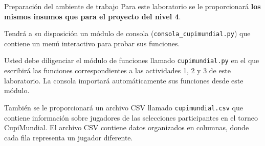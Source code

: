 \documentclass{ip-lab}
\begin{document}
\maketitle


\begin{sectionbox}{Preparación del ambiente de trabajo}
  Para este laboratorio se le proporcionará \textbf{los mismos insumos que para el proyecto del nivel 4}.
  
  Tendrá a su disposición un módulo de consola (\texttt{consola\_cupimundial.py}) que contiene un menú interactivo para probar sus funciones.

  Usted debe diligenciar el módulo de funciones llamado \texttt{cupimundial.py} en el que escribirá las funciones correspondientes a las actividades 1, 2 y 3 de este laboratorio. La consola importará automáticamente sus funciones desde este módulo.

  También se le proporcionará un archivo CSV llamado \texttt{cupimundial.csv} que contiene información sobre jugadores de las selecciones participantes en el torneo CupiMundial. El archivo CSV contiene datos organizados en columnas, donde cada fila representa un jugador diferente.
\end{sectionbox}

\pagebreak
\end{document}
